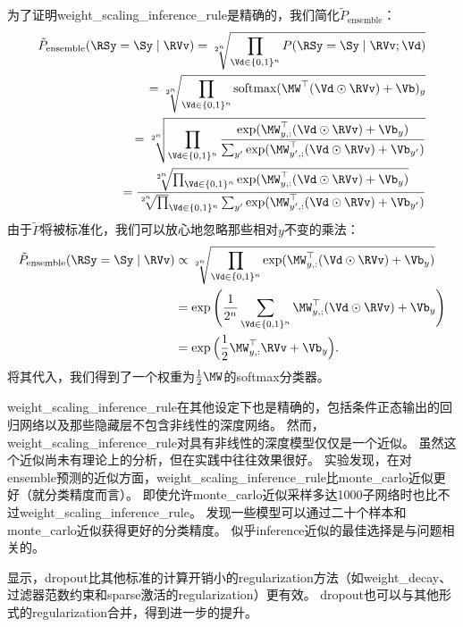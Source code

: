 为了证明\gls{weight_scaling_inference_rule}是精确的，我们简化$ \tilde{P}_{\text{ensemble}}$：
\begin{align}
\tilde{P}_{\text{ensemble}}(\RSy=\Sy \mid \RVv) =
\sqrt[2^n]{\prod_{\Vd \in \{0,1\}^n} P(\RSy = \Sy \mid \RVv; \Vd)} \\
= \sqrt[2^n]{\prod_{\Vd \in \{0,1\}^n} \text{softmax}(\MW^\top(\Vd \odot \RVv) + \Vb)_y} \\
= \sqrt[2^n]{\prod_{\Vd \in \{0,1\}^n} \frac{\exp (\MW_{y,:}^\top(\Vd \odot \RVv) + \Vb_y)}
{\sum_{y'}\exp (\MW_{y',;}^\top(\Vd \odot \RVv) + \Vb_{y'})}}\\
=  \frac{\sqrt[2^n]{\prod_{\Vd \in \{0,1\}^n}\exp (\MW_{y,:}^\top(\Vd \odot \RVv) + \Vb_y)}}
{ \sqrt[2^n] \prod_{\Vd \in \{0,1\}^n} \sum_{y'}\exp (\MW_{y',:}^\top(\Vd \odot \RVv) + \Vb_{y'})}
\end{align}
由于$\tilde P$将被标准化，我们可以放心地忽略那些相对$y$不变的乘法：
\begin{align}
\tilde{P}_{\text{ensemble}}(\RSy=\Sy \mid \RVv) &\propto 
\sqrt[2^n]{\prod_{\Vd \in \{0,1\}^n} \exp (\MW_{y,:}^\top(\Vd \odot \RVv) + \Vb_y)} \\
& = \exp \Bigg(\frac{1}{2^n} \sum_{\Vd \in \{0,1\}^n} \MW_{y,;}^\top(\Vd \odot \RVv) + \Vb_y \Bigg) \\
& = \exp \Big(\frac{1}{2}\MW_{y,:}^\top \RVv + \Vb_y \Big) .
\end{align}
将其代入，我们得到了一个权重为$\frac{1}{2}\MW$的\gls{softmax}分类器。


\gls{weight_scaling_inference_rule}在其他设定下也是精确的，包括条件正态输出的回归网络以及那些隐藏层不包含非线性的深度网络。
然而，\gls{weight_scaling_inference_rule}对具有非线性的深度模型仅仅是一个近似。
虽然这个近似尚未有理论上的分析，但在实践中往往效果很好。
\cite{Goodfellow-et-al-ICML2013}实验发现，在对\gls{ensemble}预测的近似方面，\gls{weight_scaling_inference_rule}比\gls{monte_carlo}近似更好（就分类精度而言）。
即使允许\gls{monte_carlo}近似采样多达1000子网络时也比不过\gls{weight_scaling_inference_rule}。
\cite{gal2015bayesian}发现一些模型可以通过二十个样本和\gls{monte_carlo}近似获得更好的分类精度。
似乎\gls{inference}近似的最佳选择是与问题相关的。

\cite{Srivastava14}显示，\gls{dropout}比其他标准的计算开销小的\gls{regularization}方法（如\gls{weight_decay}、过滤器范数约束和\gls{sparse}激活的\gls{regularization}）更有效。
\gls{dropout}也可以与其他形式的\gls{regularization}合并，得到进一步的提升。

